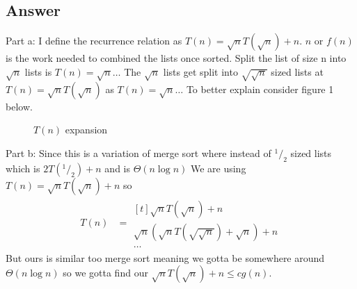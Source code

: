 \documentclass{article}
\newcommand*\rfrac[2]{{}^{#1}\!/_{#2}}
\begin{document}
\subsection*{Answer}
Part a: \newline
I define the recurrence relation as $ T(n)=\sqrt{n}T(\sqrt{n})+n$.\newline
$n$ or $f(n)$ is the work needed to combined the lists once sorted.\newline
Split the list of size n into $\sqrt{n}$ lists is $T(n)=\sqrt{n}\ldots$\newline
The $\sqrt{n}$ lists get split into $\sqrt{\sqrt{n}}$ sized lists at $T(n)=\sqrt{n}T(\sqrt{n})$ as $T(n)=\sqrt{n}\ldots$ \newline
To better explain consider figure 1 below.
\begin{figure}[h!]
\centering
		\caption{$T(n)$ expansion}
\end{figure}
\newpage
Part b:\newline
Since this is a variation of merge sort where instead of $\rfrac{1}{2}$ sized lists which is $2T(\rfrac{1}{2})+n$ and is $\Theta(n\log n)$
\newline We are using $ T(n)=\sqrt{n}T(\sqrt{n})+n$ so
\begin{align}
   T(n)&= \begin{aligned}[t]
     \sqrt{n}T(\sqrt{n})+n \\
     \sqrt{n}\left(\sqrt{n}T(\sqrt{\sqrt{n}})+\sqrt{n}\right)+n \\
      \ldots
       \end{aligned}
\end{align}
But ours is similar too merge sort meaning we gotta be somewhere around $\Theta(n\log n)$ so we gotta find our 
$\sqrt{n}T(\sqrt{n})+n \leq cg(n)$. 
\end{document}
